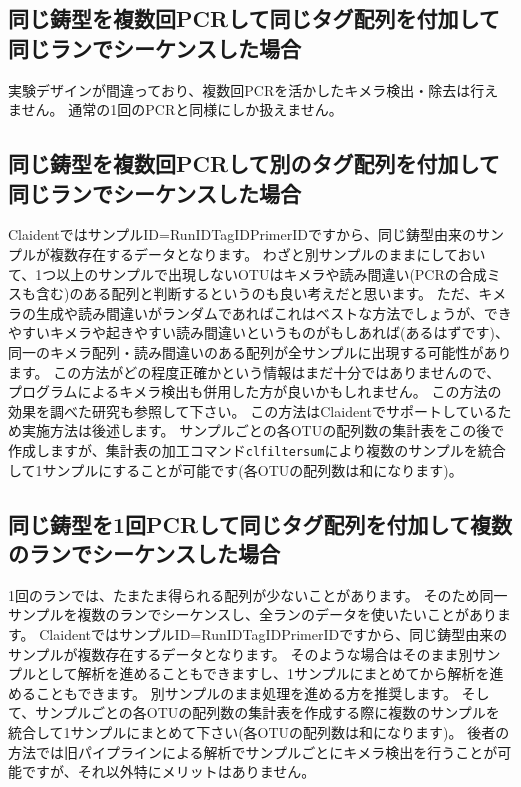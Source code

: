 \documentclass[titlepage,10pt,a4paper,english]{jsbook}
\begin{document}
\subsection{同じ鋳型を複数回PCRして同じタグ配列を付加して同じランでシーケンスした場合}

実験デザインが間違っており、複数回PCRを活かしたキメラ検出・除去は行えません。
通常の1回のPCRと同様にしか扱えません。

\subsection{同じ鋳型を複数回PCRして別のタグ配列を付加して同じランでシーケンスした場合}

ClaidentではサンプルID=RunID{\textunderscore}{\textunderscore}TagID{\textunderscore}{\textunderscore}PrimerIDですから、同じ鋳型由来のサンプルが複数存在するデータとなります。
わざと別サンプルのままにしておいて、1つ以上のサンプルで出現しないOTUはキメラや読み間違い(PCRの合成ミスも含む)のある配列と判断するというのも良い考えだと思います。
ただ、キメラの生成や読み間違いがランダムであればこれはベストな方法でしょうが、できやすいキメラや起きやすい読み間違いというものがもしあれば(あるはずです)、同一のキメラ配列・読み間違いのある配列が全サンプルに出現する可能性があります。
この方法がどの程度正確かという情報はまだ十分ではありませんので、プログラムによるキメラ検出も併用した方が良いかもしれません。
この方法の効果を調べた研究\citep{Lange2015}も参照して下さい。
この方法はClaidentでサポートしているため実施方法は後述します。
サンプルごとの各OTUの配列数の集計表をこの後で作成しますが、集計表の加工コマンド\texttt{clfiltersum}により複数のサンプルを統合して1サンプルにすることが可能です(各OTUの配列数は和になります)。

\subsection{同じ鋳型を1回PCRして同じタグ配列を付加して複数のランでシーケンスした場合}

1回のランでは、たまたま得られる配列が少ないことがあります。
そのため同一サンプルを複数のランでシーケンスし、全ランのデータを使いたいことがあります。
ClaidentではサンプルID=RunID{\textunderscore}{\textunderscore}TagID{\textunderscore}{\textunderscore}PrimerIDですから、同じ鋳型由来のサンプルが複数存在するデータとなります。
そのような場合はそのまま別サンプルとして解析を進めることもできますし、1サンプルにまとめてから解析を進めることもできます。
別サンプルのまま処理を進める方を推奨します。
そして、サンプルごとの各OTUの配列数の集計表を作成する際に複数のサンプルを統合して1サンプルにまとめて下さい(各OTUの配列数は和になります)。
後者の方法では旧パイプラインによる解析でサンプルごとにキメラ検出を行うことが可能ですが、それ以外特にメリットはありません。
\end{document}
